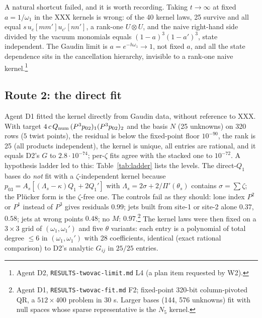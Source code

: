 \documentclass[11pt]{article}
\begin{document}
A natural shortcut failed, and it is worth recording.
Taking $t\to\infty$ at fixed $a=1/\omega_1$ in the XXX kernels is wrong: of the 40 kernel laws, 25 survive and all equal $s\,u_c[mm']u_{c'}[nn']$, a rank-one $U\otimes U$, and the naive right-hand side divided by the vacuum monomials equals $(1-a)^3(1-a')^3$, state independent.
The Gaudin limit is $a=e^{-h\omega_1}\to1$, not fixed $a$, and all the state dependence sits in the cancellation hierarchy, invisible to a rank-one naive kernel.\footnote{Agent D2, \texttt{RESULTS-\allowbreak{}twovac-\allowbreak{}limit.\allowbreak{}md} L4 (a plan item requested by W2).}

\subsection{Route 2: the direct fit}\label{sec:route2}

Agent D1 fitted the kernel directly from Gaudin data, without reference to XXX. With target $4\,c\,Q_{\rm num}\,(P^3p_{02})_1(P^3p_{02})_2$ and the basis $N$ (25 unknowns) on 320 rows ($5$ twist points), the residual is below the fixed-point floor $10^{-90}$, the rank is 25 (all products independent), the kernel is unique, all entries are rational, and it equals D2's $G$ to $2.8\cdot10^{-74}$; per-$\zeta$ fits agree with the stacked one to $10^{-72}$. A hypothesis ladder led to this: Table~\ref{tab:ladder} lists the levels.
The direct-$Q_1$ bases do \emph{not} fit with a $\zeta$-independent kernel because $p_{03}=A_s[(\Lambda_s-\kappa)Q_1+2Q_1']$ with $\Lambda_s=2\sigma+2/\Pi'(\theta_s)$ contains $\sigma=\sum\zeta$; the Plücker form is the $\zeta$-free one.
The controls fail as they should: lone index $P^2$ or $P^1$ instead of $P^3$ gives residuals $0.99$; jets built from site-1 or site-2 alone $0.37$, $0.58$; jets at wrong points $0.48$; no $M$: $0.97$.\footnote{Agent D1, \texttt{RESULTS-\allowbreak{}twovac-\allowbreak{}fit.\allowbreak{}md} F2; fixed-point 320-bit column-pivoted QR, a $512\times400$ problem in 30 s.
Larger bases (144, 576 unknowns) fit with null spaces whose sparse representative is the $N_5$ kernel.} The kernel laws were then fixed on a $3\times3$ grid of $(\omega_1,\omega_1')$ and five $\theta$ variants: each entry is a polynomial of total degree $\le6$ in $(\omega_1,\omega_1')$ with 28 coefficients, identical (exact rational comparison) to D2's analytic $G_{ij}$ in $25/25$ entries.
\end{document}

